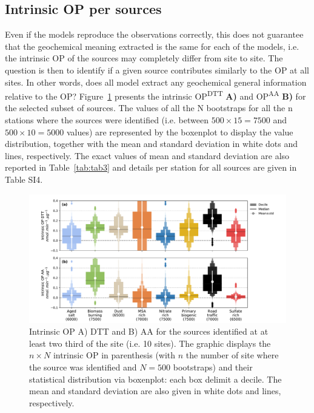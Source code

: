 \documentclass[acp]{copernicus}
\begin{document}
\subsection{Intrinsic OP per sources}%
\label{intrinsic-op-per-sources}

Even if the models reproduce the observations correctly, this does not
guarantee that the geochemical meaning extracted is the same for each of
the models, i.e. the intrinsic OP of the sources may completely differ
from site to site. The question is then to identify if a given source
contributes similarly to the OP at all sites. In other words, does all
model extract any geochemical general information relative to the OP?
Figure~\ref{fig:fig5} presents the intrinsic OP\textsuperscript{DTT} \textbf{A)} and
OP\textsuperscript{AA} \textbf{B)} for the selected subset of sources.
The values of all the N bootstraps for all the n stations where the
sources were identified (i.e. between \(500 \times 15 = 7500\) and
\(500 \times 10 = 5000\) values) are represented by the boxenplot to
display the value distribution, together with the mean and standard
deviation in white dots and lines, respectively. The exact values of
mean and standard deviation are also reported in
Table~\ref{tab:tab3} and details per
station for all sources are given in Table SI4.

\begin{figure}[ht]
    \centering
    \includegraphics[width=1.0\linewidth]{figures/fig5}
    \caption{
        Intrinsic OP A) DTT and B) AA for the sources identified at at least two third of
        the site (i.e. 10 sites). The graphic displays the $n \times N$ intrinsic OP in
        parenthesis (with $n$ the number of site where the source was identified and
        $N=500$ bootstraps) and their statistical distribution via boxenplot: each box
        delimit a decile. The mean and standard deviation are also given in white dots and
        lines, respectively.
    }%
    \label{fig:fig5}
\end{figure}
\end{document}
